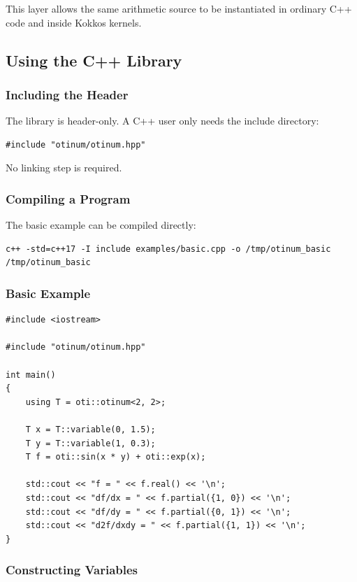 \documentclass[11pt]{article}
\begin{document}
This layer allows the same arithmetic source to be instantiated in ordinary
C++ code and inside Kokkos kernels.

\subsection{Using the C++ Library}

\subsubsection{Including the Header}

The library is header-only. A C++ user only needs the include directory:

\begin{lstlisting}[style=cppstyle]
#include "otinum/otinum.hpp"
\end{lstlisting}

No linking step is required.

\subsubsection{Compiling a Program}

The basic example can be compiled directly:

\begin{lstlisting}[style=shellstyle]
c++ -std=c++17 -I include examples/basic.cpp -o /tmp/otinum_basic
/tmp/otinum_basic
\end{lstlisting}

\subsubsection{Basic Example}

\begin{lstlisting}[style=cppstyle]
#include <iostream>

#include "otinum/otinum.hpp"

int main()
{
    using T = oti::otinum<2, 2>;

    T x = T::variable(0, 1.5);
    T y = T::variable(1, 0.3);
    T f = oti::sin(x * y) + oti::exp(x);

    std::cout << "f = " << f.real() << '\n';
    std::cout << "df/dx = " << f.partial({1, 0}) << '\n';
    std::cout << "df/dy = " << f.partial({0, 1}) << '\n';
    std::cout << "d2f/dxdy = " << f.partial({1, 1}) << '\n';
}
\end{lstlisting}

\subsubsection{Constructing Variables}
\end{document}
